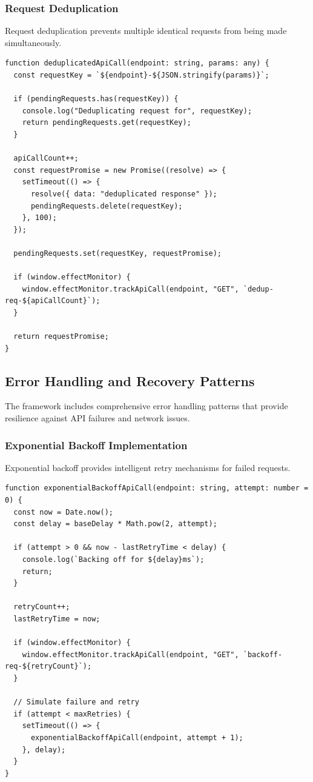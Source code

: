 \documentclass[10pt]{article}
\begin{document}
\subsubsection{Request Deduplication}

Request deduplication prevents multiple identical requests from being made simultaneously.

\begin{lstlisting}[caption={Request Deduplication Implementation}]
function deduplicatedApiCall(endpoint: string, params: any) {
  const requestKey = `${endpoint}-${JSON.stringify(params)}`;
  
  if (pendingRequests.has(requestKey)) {
    console.log("Deduplicating request for", requestKey);
    return pendingRequests.get(requestKey);
  }

  apiCallCount++;
  const requestPromise = new Promise((resolve) => {
    setTimeout(() => {
      resolve({ data: "deduplicated response" });
      pendingRequests.delete(requestKey);
    }, 100);
  });
  
  pendingRequests.set(requestKey, requestPromise);
  
  if (window.effectMonitor) {
    window.effectMonitor.trackApiCall(endpoint, "GET", `dedup-req-${apiCallCount}`);
  }
  
  return requestPromise;
}
\end{lstlisting}

\subsection{Error Handling and Recovery Patterns}

The framework includes comprehensive error handling patterns that provide resilience against API failures and network issues.

\subsubsection{Exponential Backoff Implementation}

Exponential backoff provides intelligent retry mechanisms for failed requests.

\begin{lstlisting}[caption={Exponential Backoff Implementation}]
function exponentialBackoffApiCall(endpoint: string, attempt: number = 0) {
  const now = Date.now();
  const delay = baseDelay * Math.pow(2, attempt);
  
  if (attempt > 0 && now - lastRetryTime < delay) {
    console.log(`Backing off for ${delay}ms`);
    return;
  }

  retryCount++;
  lastRetryTime = now;
  
  if (window.effectMonitor) {
    window.effectMonitor.trackApiCall(endpoint, "GET", `backoff-req-${retryCount}`);
  }

  // Simulate failure and retry
  if (attempt < maxRetries) {
    setTimeout(() => {
      exponentialBackoffApiCall(endpoint, attempt + 1);
    }, delay);
  }
}
\end{lstlisting}
\end{document}
